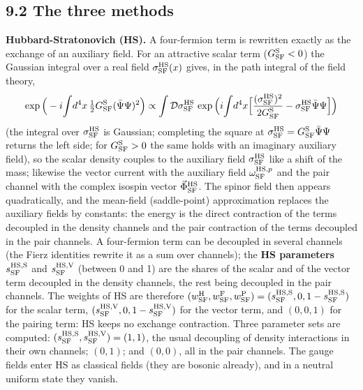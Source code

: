 \documentclass[
  10pt,
]{article}
\begin{document}
\hypertarget{the-three-methods}{%
\subsection{9.2 The three methods}\label{the-three-methods}}

\textbf{Hubbard-Stratonovich (HS).} A four-fermion term is rewritten
exactly as the exchange of an auxiliary field. For an attractive scalar
term (\(G^{\rm S}_{\rm SF}<0\)) the Gaussian integral over a real field
\(\sigma^{\rm HS}_{\rm SF}(x)\) gives, in the path integral of the field
theory,
\[\exp\Big(-i\!\int\!d^4x\,\tfrac12G^{\rm S}_{\rm SF}(\bar\Psi\Psi)^2\Big)\propto\int\mathcal D\sigma^{\rm HS}_{\rm SF}\,\exp\Big(i\!\int\!d^4x\Big[\frac{(\sigma^{\rm HS}_{\rm SF})^2}{2G^{\rm S}_{\rm SF}}-\sigma^{\rm HS}_{\rm SF}\bar\Psi\Psi\Big]\Big)\]
(the integral over \(\sigma^{\rm HS}_{\rm SF}\) is Gaussian; completing
the square at
\(\sigma^{\rm HS}_{\rm SF}=G^{\rm S}_{\rm SF}\bar\Psi\Psi\) returns the
left side; for \(G^{\rm S}_{\rm SF}>0\) the same holds with an imaginary
auxiliary field), so the scalar density couples to the auxiliary field
\(\sigma^{\rm HS}_{\rm SF}\) like a shift of the mass; likewise the
vector current with the auxiliary field \(\omega^{{\rm HS},p}_{\rm SF}\)
and the pair channel with the complex isospin vector
\(\vec\Phi^{\rm HS}_{\rm SF}\). The spinor field then appears
quadratically, and the mean-field (saddle-point) approximation replaces
the auxiliary fields by constants: the energy is the direct contraction
of the terms decoupled in the density channels and the pair contraction
of the terms decoupled in the pair channels. A four-fermion term can be
decoupled in several channels (the Fierz identities rewrite it as a sum
over channels); the \textbf{HS parameters} \(s^{\rm HS,S}_{\rm SF}\) and
\(s^{\rm HS,V}_{\rm SF}\) (between 0 and 1) are the shares of the scalar
and of the vector term decoupled in the density channels, the rest being
decoupled in the pair channels. The weights of HS are therefore
\((w^{\rm H}_{\rm SF},w^{\rm F}_{\rm SF},w^{\rm P}_{\rm SF})=(s^{\rm HS,S}_{\rm SF},0,1-s^{\rm HS,S}_{\rm SF})\)
for the scalar term,
\((s^{\rm HS,V}_{\rm SF},0,1-s^{\rm HS,V}_{\rm SF})\) for the vector
term, and \((0,0,1)\) for the pairing term: HS keeps no exchange
contraction. Three parameter sets are computed:
\((s^{\rm HS,S}_{\rm SF},s^{\rm HS,V}_{\rm SF})=(1,1)\), the usual
decoupling of density interactions in their own channels; \((0,1)\); and
\((0,0)\), all in the pair channels. The gauge fields enter HS as
classical fields (they are bosonic already), and in a neutral uniform
state they vanish.
\end{document}
